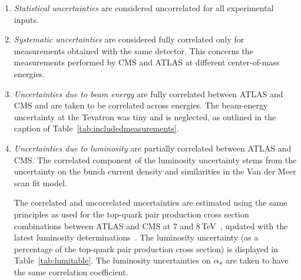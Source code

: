 \begin{enumerate}
\item \textit{Statistical uncertainties} are considered uncorrelated
  for all experimental inputs.

\item \textit{Systematic uncertainties} are considered fully
  correlated only for measurements obtained with the same
  detector. This concerns the measurements performed by CMS and ATLAS
  at different center-of-mass energies.

\item \textit{Uncertainties due to beam energy} are fully correlated
  between ATLAS and CMS and are taken to be correlated across
  energies.
  The beam-energy uncertainty at the Tevatron was tiny and is
  neglected, as outlined in the caption of
  Table~\ref{tab:includedmeasurements}. 

\item
    \textit{Uncertainties due to luminosity} are partially correlated between
    ATLAS and CMS. The correlated component of the luminosity uncertainty
    stems from the uncertainty on the bunch current density and
    similarities in the Van der Meer scan fit model.

    The correlated and uncorrelated uncertainties are estimated using the same
    principles as used for the top-quark pair production cross section combinations
    between ATLAS and CMS at 7 and
    8\,TeV~\cite{topcombination_7TeV,topcombination_8TeV}, updated
    with the latest luminosity
    determinations~\cite{Aad:2013ucp,Aaboud:2016hhf,CMS:2012rua,CMS:2013gfa,CMS:2016eto}.
    The luminosity uncertainty (as a percentage of the top-quark pair
    production cross section) is displayed in Table~\ref{tab:lumitable}.
    The luminosity uncertainties on $\alpha_s$ are taken to have the same correlation
    coefficient.


\end{enumerate}
